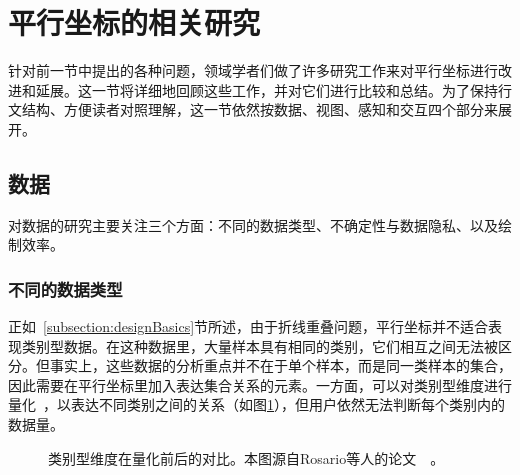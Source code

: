 \documentclass[12pt,twocolumn]{article}
\begin{document}
\section{平行坐标的相关研究}
\label{section:impro}

针对前一节中提出的各种问题，领域学者们做了许多研究工作来对平行坐标进行改进和延展。这一节将详细地回顾这些工作，并对它们进行比较和总结。为了保持行文结构、方便读者对照理解，这一节依然按数据、视图、感知和交互四个部分来展开。

\subsection{数据}
\label{subsection:dataImpro}

对数据的研究主要关注三个方面：不同的数据类型、不确定性与数据隐私、以及绘制效率。

\subsubsection{不同的数据类型}

正如~\ref{subsection:designBasics}节所述，由于折线重叠问题，平行坐标并不适合表现类别型数据。在这种数据里，大量样本具有相同的类别，它们相互之间无法被区分。但事实上，这些数据的分析重点并不在于单个样本，而是同一类样本的集合，因此需要在平行坐标里加入表达集合关系的元素。一方面，可以对类别型维度进行量化~\citep{rosario2004mapping}，以表达不同类别之间的关系（如图\ref{fig:PC_Data_Quantification}），但用户依然无法判断每个类别内的数据量。

\begin{figure}[!htb]
\centering
{}
\caption{\label{fig:PC_Data_Quantification}类别型维度在量化前后的对比。本图源自Rosario等人的论文~\citep{rosario2004mapping}~。}
\end{figure}
\end{document}
